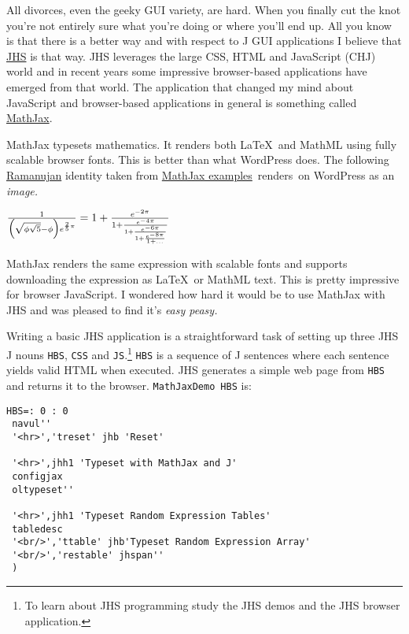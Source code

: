 All divorces, even the geeky GUI variety, are hard. When you finally cut
the knot you're not entirely sure what you're doing or where you'll end
up. All you know is that there is a better way and with respect to J GUI
applications I believe that
\href{http://www.jsoftware.com/jwiki/NYCJUG/2011-02-08/HelloWorldInJHS}{JHS}
is that way. JHS leverages the large CSS, HTML and JavaScript (CHJ)
world and in recent years some impressive browser-based applications
have emerged from that world. The application that changed my mind about
JavaScript and browser-based applications in general is something called
\href{http://www.mathjax.org/}{MathJax}.

MathJax typesets mathematics. It renders both \LaTeX\ and MathML using
fully scalable browser fonts. This is better than what WordPress does.
The following
\href{http://scienceworld.wolfram.com/biography/Ramanujan.html}{Ramanujan}
identity taken from
\href{http://www.mathjax.org/demos/tex-samples/}{MathJax
examples}~renders~on WordPress as an \emph{image.}

\begin{center}
$\frac{1}{\Bigl(\sqrt{\phi \sqrt{5}}-\phi\Bigr) e^{\frac25 \pi}} =
1+\frac{e^{-2\pi}} {1+\frac{e^{-4\pi}} {1+\frac{e^{-6\pi}}
{1+\frac{e^{-8\pi}} {1+\ldots} } } }$
\end{center}

MathJax renders the same expression with scalable fonts and supports
downloading the expression as \LaTeX\ or MathML text. This is pretty
impressive for browser JavaScript. I wondered how hard it would be to
use MathJax with JHS and was pleased to find it's \emph{easy peasy.}

Writing a basic JHS application is a straightforward task of setting up
three JHS J nouns \texttt{HBS}, \texttt{CSS} and
\texttt{JS}.\footnote{
 To learn about JHS programming study the JHS demos and the JHS browser application.
} \texttt{HBS} is a
sequence of J sentences where each sentence yields valid HTML when
executed. JHS generates a simple web page from \texttt{HBS} and returns
it to the browser. \texttt{MathJaxDemo}~\texttt{HBS} is:

\begin{tcolorbox}[breakable, size=fbox, boxrule=1pt, pad at break*=1mm,colback=cellbackground, colframe=cellborder]
\begin{lstlisting}[language=jdoc, frame=single,framerule=0pt,label=lst:scr3402X0]
 HBS=: 0 : 0
 navul''           
 '<hr>','treset' jhb 'Reset'

 '<hr>',jhh1 'Typeset with MathJax and J'
 configjax
 oltypeset''
        
 '<hr>',jhh1 'Typeset Random Expression Tables'
 tabledesc
 '<br/>','ttable' jhb'Typeset Random Expression Array' 
 '<br/>','restable' jhspan''        
 )
\end{lstlisting}
\end{tcolorbox}

